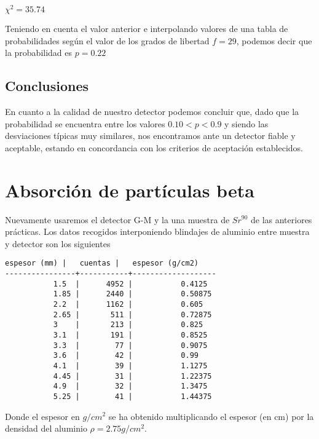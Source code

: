 \documentclass[11pt]{article}
\begin{document}
            
    
    \(\chi^2 = 35.74\)

    
 
            
    
    Teniendo en cuenta el valor anterior e interpolando valores de una tabla
de probabilidades según el valor de los grados de libertad \(f=29\),
podemos decir que la probabilidad es \(p=0.22\)

    

    \hypertarget{conclusiones}{%
\subsection{Conclusiones}\label{conclusiones}}

En cuanto a la calidad de nuestro detector podemos concluir que, dado
que la probabilidad se encuentra entre los valores \(0.10<p<0.9\) y
siendo las desviaciones típicas muy similares, nos encontramos ante un
detector fiable y aceptable, estando en concordancia con los criterios
de aceptación establecidos.

    \hypertarget{absorciuxf3n-de-partuxedculas-beta}{%
\section{Absorción de partículas
beta}\label{absorciuxf3n-de-partuxedculas-beta}}

Nuevamente usaremos el detector G-M y la una muestra de \(Sr^{90}\) de
las anteriores prácticas. Los datos recogidos interponiendo blindajes de
aluminio entre muestra y detector son los siguientes

    \begin{Verbatim}[commandchars=\\\{\}]
   espesor (mm) |   cuentas |   espesor (g/cm2)
----------------+-----------+-------------------
           1.5  |      4952 |           0.4125
           1.85 |      2440 |           0.50875
           2.2  |      1162 |           0.605
           2.65 |       511 |           0.72875
           3    |       213 |           0.825
           3.1  |       191 |           0.8525
           3.3  |        77 |           0.9075
           3.6  |        42 |           0.99
           4.1  |        39 |           1.1275
           4.45 |        31 |           1.22375
           4.9  |        32 |           1.3475
           5.25 |        41 |           1.44375
    \end{Verbatim}

    Donde el espesor en \(g/cm^2\) se ha obtenido multiplicando el espesor
(en cm) por la densidad del aluminio \(\rho = 2.75 g/cm^2\).
\end{document}
